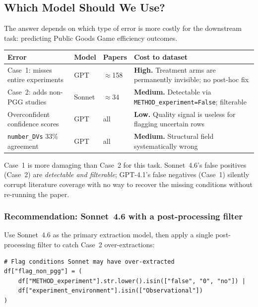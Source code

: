 \documentclass[11pt,a4paper]{article}
\begin{document}
        \subsection{Which Model Should We Use?}

        The answer depends on which type of error is more costly for the downstream task:
        predicting Public Goods Game efficiency outcomes.

        \begin{center}\small
        \begin{tabular}{llp{3.5cm}p{5cm}}
        \toprule
        \textbf{Error} & \textbf{Model} & \textbf{Papers} & \textbf{Cost to dataset} \\
        \midrule
        Case~1: misses entire experiments & GPT & $\approx$158 &
          \textbf{High.} Treatment arms are permanently invisible; no post-hoc fix \\[3pt]
        Case~2: adds non-PGG studies & Sonnet & $\approx$34 &
          \textbf{Medium.} Detectable via \texttt{METHOD\_experiment=False}; filterable \\[3pt]
        Overconfident confidence scores & GPT & all &
          \textbf{Low.} Quality signal is useless for flagging uncertain rows \\[3pt]
        \texttt{number\_DVs} 33\% agreement & GPT & all &
          \textbf{Medium.} Structural field systematically wrong \\
        \bottomrule
        \end{tabular}
        \end{center}

        \medskip
        Case~1 is more damaging than Case~2 for this task.
        Sonnet~4.6's false positives (Case~2) are \emph{detectable and filterable};
        GPT-4.1's false negatives (Case~1) silently corrupt literature coverage
        with no way to recover the missing conditions without re-running the paper.

        \subsubsection*{Recommendation: Sonnet~4.6 with a post-processing filter}

        Use Sonnet~4.6 as the primary extraction model, then apply a single
        post-processing filter to catch Case~2 over-extractions:

        \begin{verbatim}
# Flag conditions Sonnet may have over-extracted
df["flag_non_pgg"] = (
    df["METHOD_experiment"].str.lower().isin(["false", "0", "no"]) |
    df["experiment_environment"].isin(["Observational"])
)
        \end{verbatim}
\end{document}
